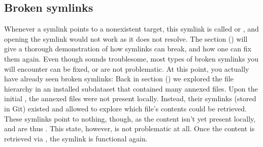 \subsection{Broken symlinks}
\label{\detokenize{basics/101-115-symlinks:broken-symlinks}}\label{\detokenize{basics/101-115-symlinks:wslfiles}}\label{\detokenize{basics/101-115-symlinks:index-6}}
\sphinxAtStartPar
Whenever a symlink points to a non\sphinxhyphen{}existent target, this symlink is called
 or , and opening the symlink would not work as it does not resolve. The
section {\hyperref[\detokenize{basics/101-136-filesystem:file-system}]{}} () will give a thorough demonstration of how symlinks can
break, and how one can fix them again. Even though  sounds
troublesome, most types of broken symlinks you will encounter can be fixed,
or are not problematic. At this point, you actually have already seen broken
symlinks: Back in section {\hyperref[\detokenize{basics/101-105-install:installds}]{}} () we explored
the file hierarchy in an installed subdataset that contained many annexed
 files. Upon the initial , the annexed files were not present locally.
Instead, their symlinks (stored in Git) existed and allowed to explore which
file’s contents could be retrieved. These symlinks point to nothing, though, as
the content isn’t yet present locally, and are thus . This state,
however, is not problematic at all. Once the content is retrieved via
, the symlink is functional again.

